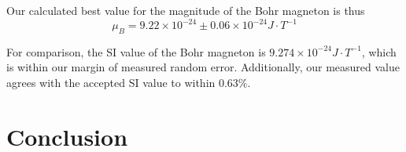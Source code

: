 \documentclass[twocolumn]{article}
\begin{document}
		Our calculated best value for the magnitude of the Bohr magneton is thus 
		\begin{equation}
			\mu_B = 9.22\times10^{-24}\pm 0.06\times10^{-24} J\cdot T^{-1}
		\end{equation}
		
		For comparison, the SI value of the Bohr magneton is $9.274\times10^{-24} J\cdot T^{-1}$, which is within our margin of measured random error.
		Additionally, our measured value agrees with the accepted SI value to within 0.63\%.
		

\section{Conclusion} \label{sec:Conclusion}



\end{document}
